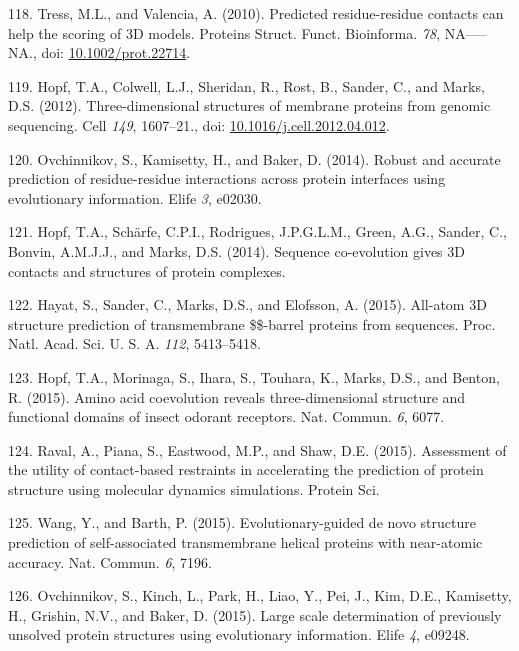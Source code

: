 \documentclass[11pt,a4paper,twoside]{book}
\theoremstyle{definition}
\theoremstyle{definition}
\theoremstyle{remark}
\begin{document}
\hypertarget{ref-Tress2010}{}
118. Tress, M.L., and Valencia, A. (2010). Predicted residue-residue
contacts can help the scoring of 3D models. Proteins Struct. Funct.
Bioinforma. \emph{78}, NA-----NA., doi:
\href{https://doi.org/10.1002/prot.22714}{10.1002/prot.22714}.

\hypertarget{ref-Hopf2012}{}
119. Hopf, T.A., Colwell, L.J., Sheridan, R., Rost, B., Sander, C., and
Marks, D.S. (2012). Three-dimensional structures of membrane proteins
from genomic sequencing. Cell \emph{149}, 1607--21., doi:
\href{https://doi.org/10.1016/j.cell.2012.04.012}{10.1016/j.cell.2012.04.012}.

\hypertarget{ref-Ovchinnikov2014a}{}
120. Ovchinnikov, S., Kamisetty, H., and Baker, D. (2014). Robust and
accurate prediction of residue-residue interactions across protein
interfaces using evolutionary information. Elife \emph{3}, e02030.

\hypertarget{ref-Hopf2014}{}
121. Hopf, T.A., Schärfe, C.P.I., Rodrigues, J.P.G.L.M., Green, A.G.,
Sander, C., Bonvin, A.M.J.J., and Marks, D.S. (2014). Sequence
co-evolution gives 3D contacts and structures of protein complexes.

\hypertarget{ref-Hayat2015a}{}
122. Hayat, S., Sander, C., Marks, D.S., and Elofsson, A. (2015).
All-atom 3D structure prediction of transmembrane \$\$-barrel proteins
from sequences. Proc. Natl. Acad. Sci. U. S. A. \emph{112}, 5413--5418.

\hypertarget{ref-Hopf2015a}{}
123. Hopf, T.A., Morinaga, S., Ihara, S., Touhara, K., Marks, D.S., and
Benton, R. (2015). Amino acid coevolution reveals three-dimensional
structure and functional domains of insect odorant receptors. Nat.
Commun. \emph{6}, 6077.

\hypertarget{ref-Raval2015a}{}
124. Raval, A., Piana, S., Eastwood, M.P., and Shaw, D.E. (2015).
Assessment of the utility of contact-based restraints in accelerating
the prediction of protein structure using molecular dynamics
simulations. Protein Sci.

\hypertarget{ref-Wang2015}{}
125. Wang, Y., and Barth, P. (2015). Evolutionary-guided de novo
structure prediction of self-associated transmembrane helical proteins
with near-atomic accuracy. Nat. Commun. \emph{6}, 7196.

\hypertarget{ref-Ovchinnikov2015a}{}
126. Ovchinnikov, S., Kinch, L., Park, H., Liao, Y., Pei, J., Kim, D.E.,
Kamisetty, H., Grishin, N.V., and Baker, D. (2015). Large scale
determination of previously unsolved protein structures using
evolutionary information. Elife \emph{4}, e09248.
\end{document}
